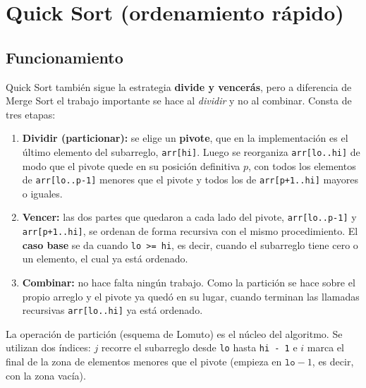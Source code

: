 
\section{Quick Sort (ordenamiento rápido)}

\subsection{Funcionamiento}

Quick Sort también sigue la estrategia \textbf{divide y vencerás}, pero a diferencia de Merge Sort el trabajo importante se hace al \emph{dividir} y no al combinar. Consta de tres etapas:

\begin{enumerate}
  \item \textbf{Dividir (particionar):} se elige un \textbf{pivote}, que en la implementación es el último elemento del subarreglo, \texttt{arr[hi]}. Luego se reorganiza \texttt{arr[lo..hi]} de modo que el pivote quede en su posición definitiva $p$, con todos los elementos de \texttt{arr[lo..p-1]} menores que el pivote y todos los de \texttt{arr[p+1..hi]} mayores o iguales.
  \item \textbf{Vencer:} las dos partes que quedaron a cada lado del pivote, \texttt{arr[lo..p-1]} y \texttt{arr[p+1..hi]}, se ordenan de forma recursiva con el mismo procedimiento. El \textbf{caso base} se da cuando \texttt{lo >= hi}, es decir, cuando el subarreglo tiene cero o un elemento, el cual ya está ordenado.
  \item \textbf{Combinar:} no hace falta ningún trabajo. Como la partición se hace sobre el propio arreglo y el pivote ya quedó en su lugar, cuando terminan las llamadas recursivas \texttt{arr[lo..hi]} ya está ordenado.
\end{enumerate}

La operación de partición (esquema de Lomuto) es el núcleo del algoritmo. Se utilizan dos índices: $j$ recorre el subarreglo desde \texttt{lo} hasta \texttt{hi - 1} e $i$ marca el final de la zona de elementos menores que el pivote (empieza en $\texttt{lo} - 1$, es decir, con la zona vacía).

